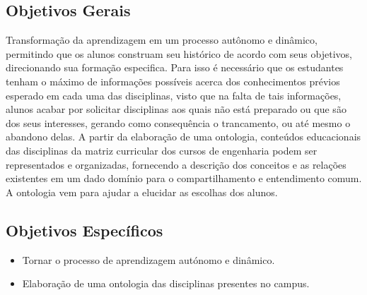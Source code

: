 
\subsection{Objetivos Gerais}

Transformação da aprendizagem em um processo autônomo e dinâmico, permitindo que os alunos construam seu histórico de acordo com seus objetivos, direcionando sua formação especifica. Para isso é necessário que os estudantes tenham o máximo de informações possíveis acerca dos conhecimentos prévios esperado em cada uma das disciplinas, visto que na falta de tais informações, alunos acabar por solicitar disciplinas aos quais não está preparado ou que são dos seus interesses, gerando como consequência o trancamento, ou até mesmo o abandono delas. A partir da elaboração de uma ontologia, conteúdos educacionais das disciplinas da matriz curricular dos cursos de engenharia podem ser representados e organizadas, fornecendo a descrição dos conceitos e as relações existentes em um dado domínio para o compartilhamento e entendimento comum. A ontologia vem para ajudar a elucidar as escolhas dos alunos.

\subsection{Objetivos Específicos}

	\begin{itemize}
		\item Tornar o processo de aprendizagem autónomo e dinâmico.

		\item Elaboração de uma ontologia das disciplinas presentes no campus.
	\end{itemize}
